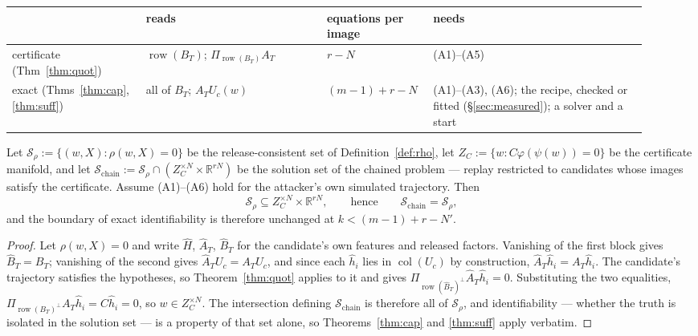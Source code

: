 \begin{center}\small
\begin{tabular}{@{}>{\raggedright\arraybackslash}p{0.2\linewidth}>{\raggedright\arraybackslash}p{0.27\linewidth}>{\raggedright\arraybackslash}p{0.13\linewidth}>{\raggedright\arraybackslash}p{0.32\linewidth}@{}}\toprule
 & reads & equations per image & needs\\ \midrule
certificate (Thm~\ref{thm:quot}) & $\operatorname{row}(B_T)$; $\Pi_{\operatorname{row}(B_T)}A_T$ & $r-N$ & (A1)--(A5)\\
exact (Thms~\ref{thm:cap}, \ref{thm:suff}) & all of $B_T$; $A_TU_c(w)$ & $(m-1)+r-N$ & (A1)--(A3), (A6); the recipe, checked or fitted (\S\ref{sec:measured}); a solver and a start\\ \bottomrule
\end{tabular}

\begin{proposition}
\label{prop:chain}
Let $\mathcal S_\rho:=\{(w,X):\rho(w,X)=0\}$ be the release-consistent set of
Definition~\ref{def:rho}, let $Z_C:=\{w:C\varphi(\psi(w))=0\}$ be the
certificate manifold, and let
$\mathcal S_{\mathrm{chain}}:=\mathcal S_\rho\cap(Z_C^{\times N}\times\mathbb R^{rN})$
be the solution set of the chained problem --- replay restricted to candidates
whose images satisfy the certificate. Assume (A1)--(A6) hold for the
attacker's own simulated trajectory. Then
\[
  \mathcal S_\rho\subseteq Z_C^{\times N}\times\mathbb R^{rN},
  \qquad\text{hence}\qquad
  \mathcal S_{\mathrm{chain}}=\mathcal S_\rho ,
\]
and the boundary of exact identifiability is therefore unchanged at
$k<(m-1)+r-N'$.
\end{proposition}

\begin{proof}
Let $\rho(w,X)=0$ and write $\hat H$, $\hat A_T$, $\hat B_T$ for the
candidate's own features and released factors. Vanishing of the first block
gives $\hat B_T=B_T$; vanishing of the second gives
$\hat A_TU_c=A_TU_c$, and since each $\hat h_i$ lies in
$\operatorname{col}(U_c)$ by construction, $\hat A_T\hat h_i=A_T\hat h_i$.
The candidate's trajectory satisfies the hypotheses, so
Theorem~\ref{thm:quot} applies to it and gives
$\Pi_{\operatorname{row}(\hat B_T)^\perp}\hat A_T\hat h_i=0$. Substituting the
two equalities, $\Pi_{\operatorname{row}(B_T)^\perp}A_T\hat h_i=C\hat h_i=0$,
so $w\in Z_C^{\times N}$. The intersection defining
$\mathcal S_{\mathrm{chain}}$ is therefore all of $\mathcal S_\rho$, and
identifiability --- whether the truth is isolated in the solution set --- is a
property of that set alone, so Theorems~\ref{thm:cap} and \ref{thm:suff}
apply verbatim.
\end{proof}


\end{center}
